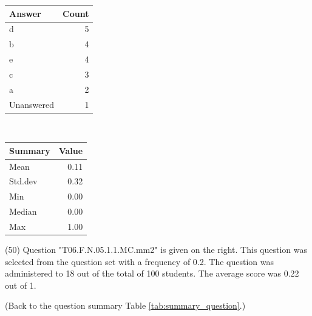 \documentclass[12pt,nohyper]{tufte-handout}\usepackage[]{graphicx}\usepackage[]{color}
\begin{document}
\begin{center}%
\begin{tabular}{lr}
  \hline
Answer & Count \\ 
  \hline
d &   5 \\ 
  b &   4 \\ 
  e &   4 \\ 
  c &   3 \\ 
  a &   2 \\ 
  Unanswered &   1 \\ 
   \hline
\end{tabular}
~~~~~~~~%
\begin{tabular}{lr}
  \hline
Summary & Value \\ 
  \hline
Mean & 0.11 \\ 
  Std.dev & 0.32 \\ 
  Min & 0.00 \\ 
  Median & 0.00 \\ 
  Max & 1.00 \\ 
   \hline
\end{tabular}
\end{center}\newpage{} (50) Question "T06.F.N.05.1.1.MC.mm2" is given on the right. This question was selected from the question set with a frequency of 0.2. The question was administered to 18 out of the total of 100 students. The average score was 0.22 out of 1.

 (Back to the question summary Table \ref{tab:summary_question}.)
\end{document}
